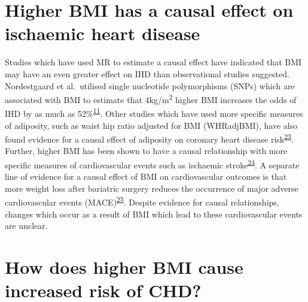 \documentclass[11pt,twoside]{bristolthesis}
\begin{document}
\hypertarget{higher-bmi-has-a-causal-effect-on-ischaemic-heart-disease}{%
\section{Higher BMI has a causal effect on ischaemic heart disease}\label{higher-bmi-has-a-causal-effect-on-ischaemic-heart-disease}}

Studies which have used MR to estimate a causal effect have indicated that BMI may have an even greater effect on IHD than observational studies suggested. Nordestgaard et al.~utilised single nucleotide polymorphisms (SNPs) which are associated with BMI to estimate that 4kg/m\textsuperscript{2} higher BMI increases the odds of IHD by as much as 52\%\textsuperscript{\protect\hyperlink{ref-Nordestgaard2012}{11}}. Other studies which have used more specific measures of adiposity, such as waist hip ratio adjusted for BMI (WHRadjBMI), have also found evidence for a causal effect of adiposity on coronary heart disease risk\textsuperscript{\protect\hyperlink{ref-Dale2017}{23}}. Further, higher BMI has been shown to have a causal relationship with more specific measures of cardiovascular events such as ischaemic stroke\textsuperscript{\protect\hyperlink{ref-Harshfield2021}{24}}. A separate line of evidence for a causal effect of BMI on cardiovascular outcomes is that more weight loss after bariatric surgery reduces the occurrence of major adverse cardiovascular events (MACE)\textsuperscript{\protect\hyperlink{ref-Jimenez2021}{25}}. Despite evidence for causal relationships, changes which occur as a result of BMI which lead to these cardiovascular events are unclear.

\hypertarget{how-does-higher-bmi-cause-increased-risk-of-chd}{%
\section{How does higher BMI cause increased risk of CHD?}\label{how-does-higher-bmi-cause-increased-risk-of-chd}}
\end{document}
